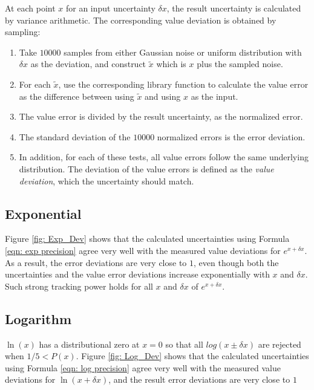 \documentclass[twoside]{article}
\numberwithin{equation}{section}
\begin{document}
At each point $x$ for an input uncertainty $\delta x$, the result uncertainty is calculated by variance arithmetic.
The corresponding value deviation is obtained by sampling:
\begin{enumerate}

\item Take $10000$ samples from either Gaussian noise or uniform distribution with $\delta x$ as the deviation, and construct $\tilde{x}$ which is $x$ plus the sampled noise.  

\item For each $\tilde{x}$, use the corresponding library function to calculate the value error as the difference between using $\tilde{x}$ and using $x$ as the input.

\item The value error is divided by the result uncertainty, as the normalized error.

\item The standard deviation of the $10000$ normalized errors is the error deviation.

\item In addition, for each of these tests, all value errors follow the same underlying distribution.
The deviation of the value errors is defined as the \emph{value deviation}, which the uncertainty should match.

\end{enumerate}

\subsection{Exponential}

Figure \ref{fig: Exp_Dev} shows that the calculated uncertainties using Formula \eqref{eqn: exp precision} agree very well with the measured value deviations for $e^{x + \delta x}$.
As a result, the error deviations are very close to $1$, even though both the uncertainties and the value error deviations increase exponentially with $x$ and $\delta x$.
Such strong tracking power holds for all $x$ and $\delta x$ of $e^{x + \delta x}$. 

\subsection{Logarithm}

$\ln(x)$ has a distributional zero at $x=0$ so that all $log(x \pm \delta x)$ are rejected when $1/5 < P(x)$.
Figure \ref{fig: Log_Dev} shows that the calculated uncertainties using Formula \eqref{eqn: log precision} agree very well with the measured value deviations for $\ln(x + \delta x)$, and the result error deviations are very close to $1$
\end{document}
